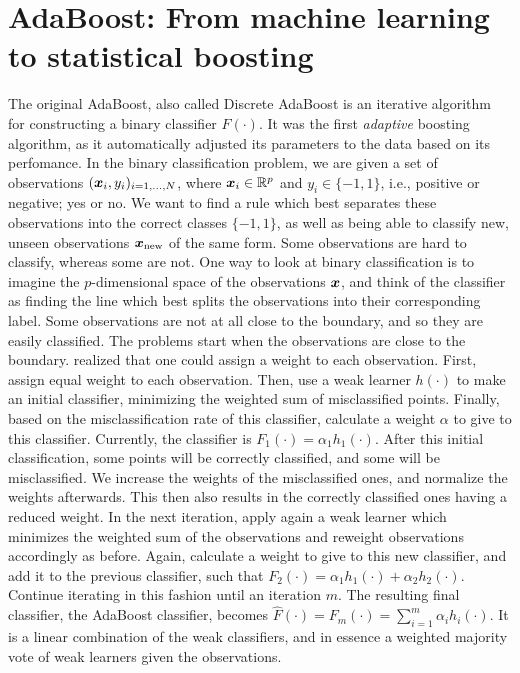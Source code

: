 \section{AdaBoost: From machine learning to statistical boosting}
The original AdaBoost, also called Discrete AdaBoost \citep{adaboost} is an iterative algorithm for constructing a binary classifier $F(\cdot)$.
It was the first \textit{adaptive} boosting algorithm, as it automatically adjusted its parameters to the data based on its perfomance.
In the binary classification problem, we are given a set of observations $(\bm{x}_i,y_i)_{i=1,\ldots,N}$, where $\bm{x}_i\in\mathbb{R}^p$ and $y_i\in\{-1,1\}$, i.e., positive or negative; yes or no.
We want to find a rule which best separates these observations into the correct classes $\{-1,1\}$, as well as being able to classify new, unseen observations $\bm{x}_{\text{new}}$ of the same form.
Some observations are hard to classify, whereas some are not.
One way to look at binary classification is to imagine the $p$-dimensional space of the observations $\bm{x}$, and think of the classifier as finding the line which best splits the observations into their corresponding label. 
Some observations are not at all close to the boundary, and so they are easily classified.
The problems start when the observations are close to the boundary.
\citet{adaboost} realized that one could assign a weight to each observation.
First, assign equal weight to each observation.
Then, use a weak learner $h(\cdot)$ to make an initial classifier, minimizing the weighted sum of misclassified points.
Finally, based on the misclassification rate of this classifier, calculate a weight $\alpha$ to give to this classifier.
Currently, the classifier is $F_1(\cdot)=\alpha_1h_1(\cdot)$.
After this initial classification, some points will be correctly classified, and some will be misclassified.
We increase the weights of the misclassified ones, and normalize the weights afterwards.
This then also results in the correctly classified ones having a reduced weight.
In the next iteration, apply again a weak learner which minimizes the weighted sum of the observations and reweight observations accordingly as before.
Again, calculate a weight to give to this new classifier, and add it to the previous classifier, such that $F_2(\cdot)=\alpha_1h_1(\cdot)+\alpha_2h_2(\cdot)$.
Continue iterating in this fashion until an iteration $m$.
The resulting final classifier, the AdaBoost classifier, becomes $\hat{F}(\cdot)=F_m(\cdot)=\sum_{i=1}^m\alpha_ih_i(\cdot)$.
It is a linear combination of the weak classifiers, and in essence a weighted majority vote of weak learners given the observations.

